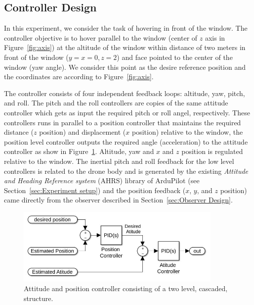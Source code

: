 \documentclass[ twoside, 12pt ]{article}
\begin{document}
\subsection{Controller Design}
\label{sec:Controller Design}

In this experiment, we consider the task of hovering in front of the window. The controller objective is to hover parallel to the window (center of $z$ axis in Figure~\ref{fig:axis}) at the altitude of the window within distance of two meters in front of the window ($y=x=0 , z=2$) and face pointed to the center of the window (yaw angle).
We consider this point as the desire reference position and the coordinates are according to Figure~\ref{fig:axis}.

The controller consists of four independent feedback loops: altitude, yaw, pitch, and roll.
The pitch and the roll controllers are copies of the same attitude controller which gets as input the required pitch or roll angel, respectively. These controllers runs in parallel to a position controller that maintains the required distance ($z$ position) and displacement ($x$ position) relative to the window, the position level controller outputs the required angle (acceleration) to the attitude controller as show in Figure~\ref{fig:controllerStracture}.
Altitude, yaw and $x$ and $z$ position is regulated relative to the window.
The inertial pitch and roll feedback for the low level controllers is related to the drone body and is generated by the existing \textit{Attitude and Heading Reference system} (AHRS) library of ArduPilot (see Section~\ref{sec:Experiment setup}) and the position feedback ($x$, $y$, and $z$ position) came directly from the observer described in Section~\ref{sec:Observer Design}.

\begin{figure} %
    \centerline{\includegraphics[width=100mm]{two_level_controller.jpg}}
    \caption{Attitude and position controller consisting of a two level, cascaded, structure.}
    \label{fig:controllerStracture}
\end{figure}
\end{document}
